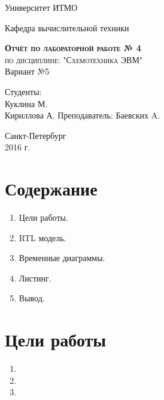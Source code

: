 \documentclass[a4paper, 10pt]{article}
\begin{document}
    \begin{titlepage}
        \begin{center}
            \large
            Университет ИТМО
            \vspace{3cm}


            Кафедра вычислительной техники
            \vspace{4cm}

            \textsc{ \textbf{Отчёт по лабораторной работе  № 4} \\
            по дисциплине: "Схемотехника ЭВМ"}\\Вариант №5\\[8mm]

            \bigskip
        \end{center}
        \vspace{3cm}

        \hfill\begin{flushright}
             Студенты: \\
             Куклина М.\\
             Кириллова А.
             \vfill
             Преподаватель:
             Баевских A.
        \end{flushright}
        \vfill
        \vfill
        \vfill
        \vfill
        \vfill
        \begin{center}
            Санкт-Петербург \\2016 г.
        \end{center}
    \end{titlepage}
   \newpage
    \section*{Содержание}
        \begin{enumerate}
            \item Цели работы.
            \item RTL модель.
            \item Временные диаграммы.
            \item Листинг.
            \item Вывод.
        \end{enumerate}

    \section*{Цели работы}
        \begin{enumerate}
            \item
            \item
            \item
        \end{enumerate}
\end{document}
